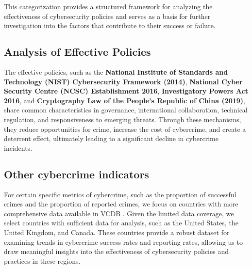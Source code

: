     This categorization provides a structured framework for analyzing the effectiveness of cybersecurity policies and
    serves as a basis for further investigation into the factors that contribute to their success or failure.
    
\subsection{Analysis of Effective Policies}\label{subsec:analysis-of-effective-policies} %
    The effective policies, such as the
    \textbf{National Institute of Standards and Technology (NIST) Cybersecurity Framework (2014)},
    \textbf{National Cyber Security Centre (NCSC) Establishment 2016},
    \textbf{Investigatory Powers Act 2016}, and
    \textbf{Cryptography Law of the People’s Republic of China (2019)},
    share common characteristics in governance, international collaboration, technical regulation, and responsiveness to emerging threats.
    Through these mechanisms, they reduce opportunities for crime, increase the cost of cybercrime, and create a deterrent effect,
    ultimately leading to a significant decline in cybercrime incidents.

\subsection{Other cybercrime indicators}\label{subsec:other-cybercrime-indicators} %
    For certain specific metrics of cybercrime, such as the proportion of successful crimes and the proportion of reported crimes,
    we focus on countries with more comprehensive data available in VCDB .
    Given the limited data coverage, we select countries with sufficient data for analysis,
    such as the United States, the United Kingdom, and Canada.
    These countries provide a robust dataset for examining trends in cybercrime success rates and reporting rates,
    allowing us to draw meaningful insights into the effectiveness of cybersecurity policies and practices in these regions.

